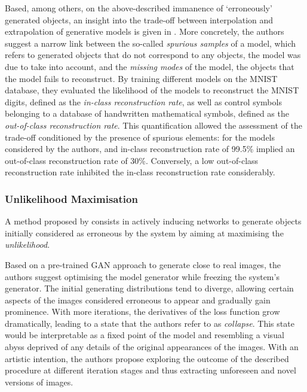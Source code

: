 \documentclass{article}
\begin{document}
Based, among others, on the above-described immanence of `erroneously' generated objects,
an insight into the trade-off between interpolation and extrapolation of generative models
is given in \cite{keglSpuriousSamplesDeep2018}.
More concretely, the authors suggest a narrow link between the
so-called \emph{spurious samples} \cite{bengioGeneralizedDenoisingAutoEncoders2013}
of a model, which refers to generated objects that do not correspond 
to any objects, the model was due to take into account, and the \emph{missing modes}
of the model, the objects that the model fails to reconstruct.
By training different models on the MNIST database, they evaluated the
likelihood of the models to reconstruct the MNIST digits, defined as the \emph{in-class reconstruction rate}, as well as control 
symbols belonging to a database of handwritten mathematical symbols,
defined as the \emph{out-of-class reconstruction rate}.
This quantification allowed the assessment of the trade-off conditioned by
the presence of spurious elements: for the models considered by the authors, and in-class reconstruction rate of 99.5\% implied an out-of-class reconstruction rate of 30\%.
Conversely, a low out-of-class reconstruction rate inhibited the in-class reconstruction rate considerably.


\subsubsection{Unlikelihood Maximisation}

A method proposed by \cite{broadAmplifyingUncanny} consists in actively inducing networks to generate objects initially considered as erroneous by the system by aiming at maximising the \emph{unlikelihood}.

Based on a pre-trained GAN approach to generate close to real images,
the authors suggest optimising the model generator while freezing the system's generator.
The initial generating distributions tend to diverge, allowing certain 
aspects of the images considered erroneous to appear and gradually gain prominence.
With more iterations, 
the derivatives of the loss function grow dramatically, leading to a state that
the authors refer to as \emph{collapse}. 
This state would be interpretable as a fixed point of the model and resembling 
a visual abyss deprived of any details of the original appearances of the images. 
With an artistic intention, the authors propose exploring the outcome of the
described procedure at different iteration stages and thus extracting
unforeseen and novel versions of images.
\end{document}
